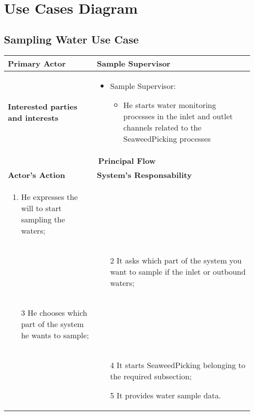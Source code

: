 \newpage \chapter{\textbf{Use Cases Diagram}}

\section{Sampling Water Use Case}

\begin{longtable}{|p{7cm}|p{7cm}|}

\hline
\textbf{Primary Actor}  & Sample Supervisor\\


\hline
\textbf{Interested parties and interests} &
\begin{itemize}
\item Sample Supervisor:
	\begin{itemize}
 	\item He starts water monitoring processes in the inlet and outlet channels related 	to the SeaweedPicking processes

	\end{itemize}
\end{itemize}
\\


\hline
\multicolumn{2}{|c|}{\textbf{Principal Flow}} \\

\hline
\textbf{Actor's Action} & \textbf{System's Responsability}\\

\hline

\begin{enumerate}
\item He expresses the will to start sampling the waters;
\end{enumerate} &\\

& 
\begin{enumerate}
\item[2]It asks which part of the system you want to sample if the inlet or outbound waters;
\end{enumerate}\\

\begin{enumerate}
\item[3]He chooses which part of the system he wants to sample;			
\end{enumerate} &\\


& 
\begin{enumerate}
\item[4]It starts SeaweedPicking belonging to the required subsection;
\item[5]It provides water sample data.
\end{enumerate}\\

\hline
\end{longtable}

